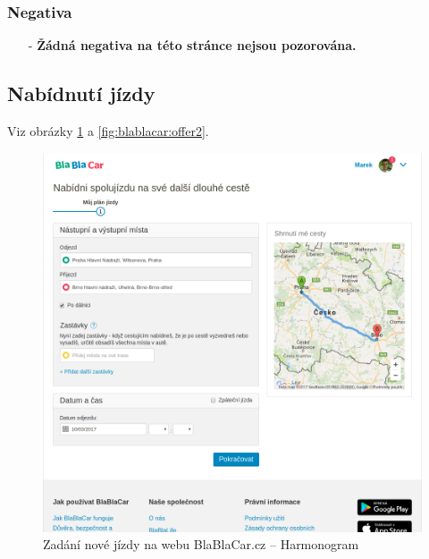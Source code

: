 \subsubsection*{Negativa}
\begin{itemize}
    \item[-] \textbf{Žádná negativa na této stránce nejsou pozorována.}
\end{itemize}



\newpage
\subsection{Nabídnutí jízdy}
Viz obrázky \ref{fig:blablacar:offer} a \ref{fig:blablacar:offer2}.
\begin{figure}[h]
    \centering
    \includegraphics[width=1.0\textwidth]{media/blablacar/offer.png}
    \caption{Zadání nové jízdy na webu BlaBlaCar.cz -- Harmonogram}
    \label{fig:blablacar:offer}
\end{figure}

